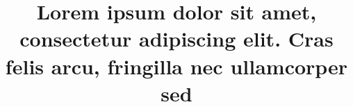 \documentclass[conference]{IEEEtran}
\begin{document}
\title{Lorem ipsum dolor sit amet, consectetur adipiscing elit. Cras felis arcu, fringilla nec ullamcorper sed}








\end{document}
